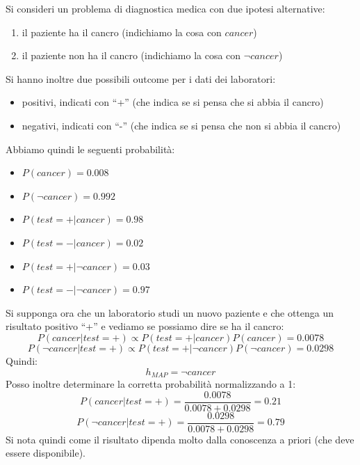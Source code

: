 \begin{esercizio}
  Si consideri un problema di diagnostica medica con due ipotesi alternative:
  \begin{enumerate}
    \item il paziente ha il cancro (indichiamo la cosa con $cancer$)
    \item il paziente non ha il cancro (indichiamo la cosa con $\neg cancer$)
  \end{enumerate}
  Si hanno inoltre due possibili outcome per i dati dei laboratori:
  \begin{itemize}
    \item positivi, indicati con ``+'' (che indica se si pensa che si abbia il
    cancro)
    \item negativi, indicati con ``-'' (che indica se si pensa che non si abbia
    il cancro)
  \end{itemize}
  Abbiamo quindi le seguenti probabilità:
  \begin{itemize}
    \item $P(cancer)=0.008$
    \item $P(\neg cancer)=0.992$
    \item $P(test=+|cancer)=0.98$
    \item $P(test=-|cancer)=0.02$
    \item $P(test=+|\neg cancer)=0.03$
    \item $P(test=-|\neg cancer)=0.97$
  \end{itemize}
  Si supponga ora che un laboratorio studi un nuovo paziente e che ottenga un
  risultato positivo ``+'' e vediamo se possiamo dire se ha il cancro:
  \[P(cancer|test=+)\varpropto P(test=+|cancer)P(cancer)=0.0078\]
  \[P(\neg cancer|test=+)\varpropto P(test=+|\neg cancer)P(\neg cancer)=0.0298\]
  Quindi:
  \[h_{MAP}=\neg cancer\]
  Posso inoltre determinare la corretta probabilità normalizzando a 1:
  \[P(cancer|test=+)=\frac{0.0078}{0.0078+0.0298}=0.21\]
  \[P(\neg cancer|test=+)=\frac{0.0298}{0.0078+0.0298}=0.79\]
  Si nota quindi come il risultato dipenda molto dalla conoscenza a priori (che
  deve essere disponibile).
\end{esercizio}
